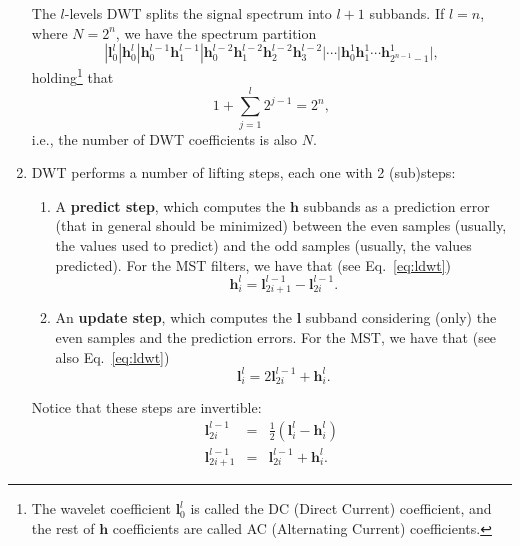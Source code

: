 \begin{enumerate}
  The $l$-levels DWT splits the signal spectrum into $l+1$ subbands. If
  $l=n$, where $N=2^n$, we have the spectrum partition
  \begin{equation*}
        | \mathbf{l}^l_0 | \mathbf{h}^l_0 | \mathbf{h}^{l-1}_0 \mathbf{h}^{l-1}_1 | \mathbf{h}^{l-2}_0 \mathbf{h}^{l-2}_1 \mathbf{h}^{l-2}_2 \mathbf{h}^{l-2}_3 | \cdots | \mathbf{h}^1_0 \mathbf{h}^1_1 \cdots \mathbf{h}^1_{2^{n-1}-1} |,
  \end{equation*}
  holding\footnote{The wavelet coefficient ${\mathbf l}^l_0$ is called the DC
    (Direct Current) coefficient, and the rest of ${\mathbf h}$
    coefficients are called AC (Alternating Current) coefficients.} that
  \begin{equation}
    1+\sum_{j=1}^l 2^{j-1}=2^n,
  \end{equation}
  i.e., the number of DWT coefficients is also $N$.

\item DWT performs a number of lifting steps, each one with
  2 (sub)steps:
  \begin{enumerate}
  \item A \textbf{predict step}, which computes the ${\mathbf h}$
    subbands as a prediction error (that in general should be
    minimized) between the even samples (usually, the values used to
    predict) and the odd samples (usually, the values predicted). For
    the MST filters, we have that (see Eq.~\eqref{eq:ldwt})
    \begin{equation}
      {\mathbf h}^l_i = {\mathbf l}^{l-1}_{2i+1} - {\mathbf l}^{l-1}_{2i}.
    \end{equation}
    
  \item An \textbf{update step}, which computes the ${\mathbf l}$
    subband considering (only) the even samples and the prediction
    errors. For the MST, we have that (see also Eq.~\eqref{eq:ldwt})
    \begin{equation}
      {\mathbf l}^l_i = 2{\mathbf l}^{l-1}_{2i} + {\mathbf h}^l_i.
    \end{equation}
  \end{enumerate}

  Notice that these steps are invertible:
  \begin{equation}
    \begin{array}{rcl}
      {\mathbf l}^{l-1}_{2i} & = & \frac{1}{2}({\mathbf l}^l_i - {\mathbf h}^l_i)\\
      {\mathbf l}^{l-1}_{2i+1} & = & {\mathbf l}^{l-1}_{2i} + {\mathbf h}^l_i.
    \end{array}
  \end{equation}

\end{enumerate}

